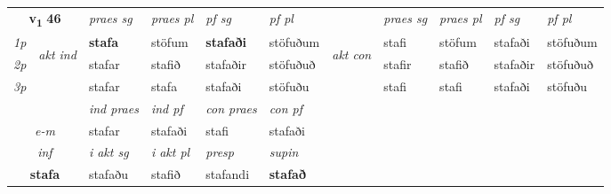 \noindent
\begin{tabular}{lllllllllll} \toprule
\multicolumn{2}{c}{\textbf{v{\textsubscript{1}}} \Large{\textbf{46}}}  &  \textit{praes sg}  & \textit{praes pl}  &\textit{ pf sg} & \textit{pf pl} &  &  \textit{praes sg}  & \textit{praes pl}  & \textit{pf sg} & \textit{pf pl } \\*
	\cmidrule{3-6} \cmidrule{8-11}
 {\textit{1p}} & \multirow{3}{*}{\begin{turn}{90}\textit{akt ind}\end{turn}} & \textbf{stafa} & stöfum & \textbf{stafaði} & stöfuðum & \multirow{3}{*}{\begin{turn}{90}\textit{akt con}\end{turn}} &stafi & stöfum & stafaði & stöfuðum\\*
 {\textit{2p}} &  &  stafar  & stafið & stafaðir & stöfuðuð & & stafir & stafið & stafaðir & stöfuðuð \\*
{\textit{3p}} &  & stafar & stafa & stafaði & stöfuðu & & stafi & stafi& stafaði & stöfuðu \\*
\cmidrule{3-6} \cmidrule{8-11}

   & &  \textit{ind praes} & \textit{ind pf} & \textit{con praes} & \textit{con pf} \\*
\multicolumn{2}{c}{ \textit{e-m} } & stafar & stafaði & stafi & stafaði \\*

\cmidrule{3-6}
   \multicolumn{2}{c}{\textit{inf}}  & \textit{i akt sg} & \textit{i akt pl}   & \textit{presp} & \textit{supin}   \\*
  \multicolumn{2}{c}{\textbf{stafa}} & stafaðu  & stafið   & stafandi &  \textbf{stafað}   \\*
\end{tabular}

